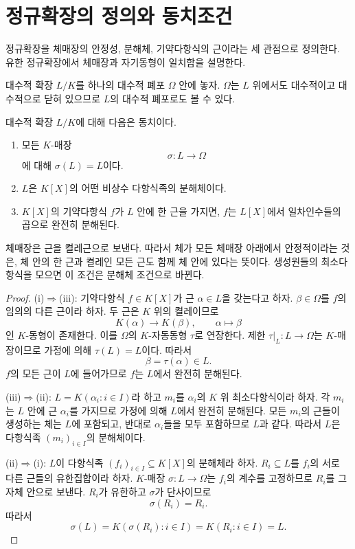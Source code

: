 \clearpage
\section{정규확장의 정의와 동치조건}
\label{sec:normal-equivalences}

\begin{learninggoal}
정규확장을 체매장의 안정성, 분해체, 기약다항식의 근이라는 세 관점으로 정의한다. 유한 정규확장에서 체매장과 자기동형이 일치함을 설명한다.
\end{learninggoal}

대수적 확장 $L/K$를 하나의 대수적 폐포 $\Omega$ 안에 놓자. $\Omega$는 $L$ 위에서도 대수적이고 대수적으로 닫혀 있으므로 $L$의 대수적 폐포로도 볼 수 있다.

\begin{theorem}
대수적 확장 $L/K$에 대해 다음은 동치이다.
\begin{enumerate}[label=(\roman*)]
  \item 모든 $K$-매장
  \[
    \sigma:L\longrightarrow\Omega
  \]
  에 대해 $\sigma(L)=L$이다.
  \item $L$은 $K[X]$의 어떤 비상수 다항식족의 분해체이다.
  \item $K[X]$의 기약다항식 $f$가 $L$ 안에 한 근을 가지면, $f$는 $L[X]$에서 일차인수들의 곱으로 완전히 분해된다.
\end{enumerate}
\end{theorem}

\begin{proofidea}
체매장은 근을 켤레근으로 보낸다. 따라서 체가 모든 체매장 아래에서 안정적이라는 것은, 체 안의 한 근과 켤레인 모든 근도 함께 체 안에 있다는 뜻이다. 생성원들의 최소다항식을 모으면 이 조건은 분해체 조건으로 바뀐다.
\end{proofidea}

\begin{proof}
(i)$\Rightarrow$(iii): 기약다항식 $f\in K[X]$가 근 $\alpha\in L$을 갖는다고 하자. $\beta\in\Omega$를 $f$의 임의의 다른 근이라 하자. 두 근은 $K$ 위의 켤레이므로
\[
  K(\alpha)\longrightarrow K(\beta),
  \qquad \alpha\longmapsto\beta
\]
인 $K$-동형이 존재한다. 이를 $\Omega$의 $K$-자동동형 $\tau$로 연장한다. 제한 $\tau|_L:L\to\Omega$는 $K$-매장이므로 가정에 의해 $\tau(L)=L$이다. 따라서
\[
  \beta=\tau(\alpha)\in L.
\]
$f$의 모든 근이 $L$에 들어가므로 $f$는 $L$에서 완전히 분해된다.

(iii)$\Rightarrow$(ii): $L=K(\alpha_i:i\in I)$라 하고 $m_i$를 $\alpha_i$의 $K$ 위 최소다항식이라 하자. 각 $m_i$는 $L$ 안에 근 $\alpha_i$를 가지므로 가정에 의해 $L$에서 완전히 분해된다. 모든 $m_i$의 근들이 생성하는 체는 $L$에 포함되고, 반대로 $\alpha_i$들을 모두 포함하므로 $L$과 같다. 따라서 $L$은 다항식족 $(m_i)_{i\in I}$의 분해체이다.

(ii)$\Rightarrow$(i): $L$이 다항식족 $(f_i)_{i\in I}\subseteq K[X]$의 분해체라 하자. $R_i\subseteq L$를 $f_i$의 서로 다른 근들의 유한집합이라 하자. $K$-매장 $\sigma:L\to\Omega$는 $f_i$의 계수를 고정하므로 $R_i$를 그 자체 안으로 보낸다. $R_i$가 유한하고 $\sigma$가 단사이므로
\[
  \sigma(R_i)=R_i.
\]
따라서
\[
  \sigma(L)
  =K(\sigma(R_i):i\in I)
  =K(R_i:i\in I)=L.
\]
\end{proof}

